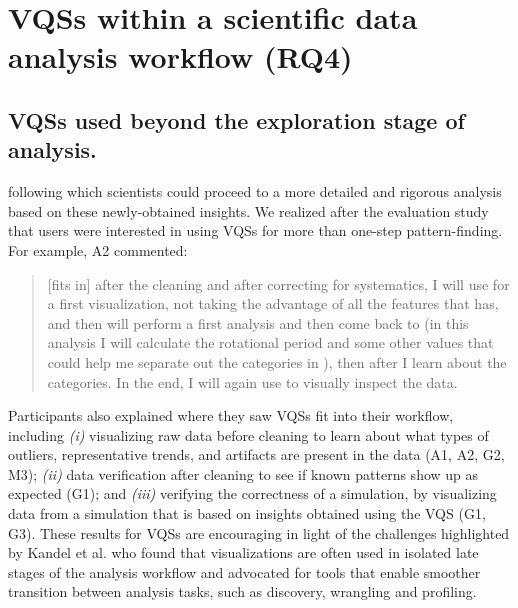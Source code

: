 \section{VQSs within a scientific data analysis workflow (RQ4)}
\subsection{VQSs used beyond the exploration stage of analysis.} 
\par {}  following which scientists could proceed to a more detailed and rigorous analysis based on these newly-obtained insights. We realized after the evaluation study that users were interested in using VQSs for more than one-step pattern-finding. For example, A2 commented:
\begin{quote}
[\zv fits in] after the cleaning and after correcting for systematics, I will use \zv for a first visualization, not taking the advantage of all the features that \zv has, and then will perform a first analysis and then come back to \zv (in this analysis I will calculate the rotational period and some other values that could help me separate out the categories in \zv), then after I learn about the categories. In the end, I will again use \zv to visually inspect the data. %
\end{quote}
Participants also explained where they saw VQSs fit into their workflow, including {\em (i)} visualizing raw data before cleaning to learn about what types of outliers, representative trends, and artifacts are present in the data (A1, A2, G2, M3); {\em (ii)}
 data verification after cleaning to see if known patterns show up as expected (G1);
 and {\em (iii)}
verifying the correctness of a simulation, by visualizing data from a simulation that is based on insights obtained using the VQS (G1, G3). These results for VQSs are encouraging in light of the challenges highlighted by Kandel et al. who found that visualizations are often used in isolated late stages of the analysis workflow and advocated for tools that enable smoother transition between analysis tasks, such as discovery, wrangling and profiling\cite{Kandel2012}.
